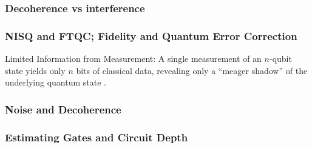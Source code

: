 \subsubsection{Decoherence vs interference}


\subsubsection{NISQ and FTQC; Fidelity and Quantum Error Correction}


Limited Information from Measurement: A single measurement of an $n$-qubit state yields only $n$ bits of classical data, 
revealing only a \enquote{meager shadow} of the underlying quantum state \cite{Preskill:2023}.

\subsubsection{Noise and Decoherence}


\subsubsection{Estimating Gates and Circuit Depth}






